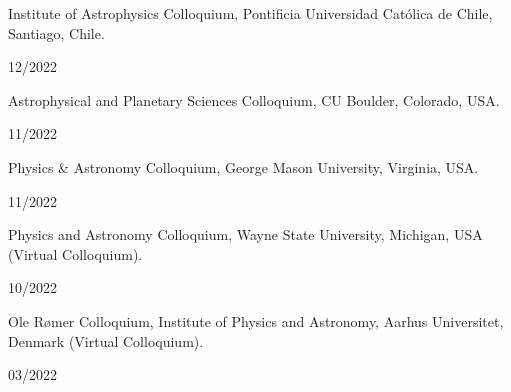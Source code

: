 \documentclass[12pt, a4paper]{article} %
\begin{document}
\begin{minipage}[t]{0.7\textwidth}
\begin{flushleft}%
  \setlength{\leftskip}{0.2cm}%
Institute of Astrophysics Colloquium, Pontificia Universidad Cat\'olica de Chile, Santiago, Chile.
\end{flushleft}
\end{minipage}
\begin{minipage}[t]{0.3\textwidth}
\hfill 12/2022
\end{minipage}
\vspace{0.2cm}

\begin{minipage}[t]{0.7\textwidth}
\begin{flushleft}%
  \setlength{\leftskip}{0.2cm}%
Astrophysical and Planetary Sciences Colloquium, CU Boulder, Colorado, USA.
\end{flushleft}
\end{minipage}
\begin{minipage}[t]{0.3\textwidth}
\hfill 11/2022
\end{minipage}
\vspace{0.2cm}

\begin{minipage}[t]{0.7\textwidth}
\begin{flushleft}%
  \setlength{\leftskip}{0.2cm}%
Physics \& Astronomy Colloquium, George Mason University, Virginia, USA.
\end{flushleft}
\end{minipage}
\begin{minipage}[t]{0.3\textwidth}
\hfill 11/2022
\end{minipage}
\vspace{0.2cm}

\begin{minipage}[t]{0.7\textwidth}
\begin{flushleft}%
  \setlength{\leftskip}{0.2cm}%
Physics and Astronomy Colloquium, Wayne State University, Michigan, USA (Virtual Colloquium).
\end{flushleft}
\end{minipage}
\begin{minipage}[t]{0.3\textwidth}
\hfill 10/2022
\end{minipage}
\vspace{0.2cm}

\begin{minipage}[t]{0.7\textwidth}
\begin{flushleft}%
  \setlength{\leftskip}{0.2cm}%
Ole Rømer Colloquium, Institute of Physics and Astronomy, Aarhus Universitet, Denmark (Virtual Colloquium).
\end{flushleft}
\end{minipage}
\begin{minipage}[t]{0.3\textwidth}
\hfill 03/2022
\end{minipage}
\vspace{0.2cm}
\end{document}

